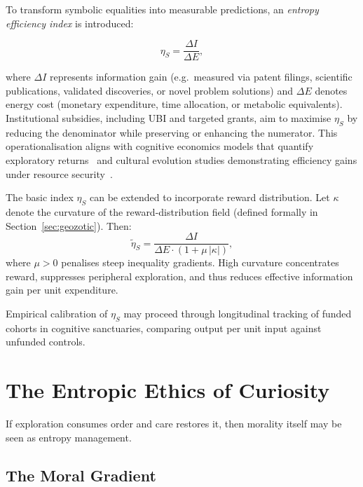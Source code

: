 \documentclass[12pt,a4paper]{article}
\theoremstyle{definition}
\begin{document}
To transform symbolic equalities into measurable predictions, an
\emph{entropy efficiency index} is introduced:

\begin{equation}
  \eta_S = \frac{\Delta I}{\Delta E},
  \label{eq:etaS}
\end{equation}

where $\Delta I$ represents information gain (e.g.\ measured via patent
filings, scientific publications, validated discoveries, or novel problem
solutions) and $\Delta E$ denotes energy cost (monetary expenditure, time
allocation, or metabolic equivalents).  Institutional subsidies, including UBI
and targeted grants, aim to maximise $\eta_S$ by reducing the denominator while
preserving or enhancing the numerator.  This operationalisation aligns with
cognitive economics models that quantify exploratory
returns~\citep{friston2023} and cultural evolution studies demonstrating
efficiency gains under resource security~\citep{henrich2016}.

\begin{tcolorbox}[formalbox, title={Extended Index: Inequality Penalty}]
  The basic index $\eta_S$ can be extended to incorporate reward distribution.
  Let $\kappa$ denote the curvature of the reward-distribution field (defined
  formally in Section~\ref{sec:geozotic}).  Then:
  \begin{equation}
    \tilde{\eta}_S = \frac{\Delta I}{\Delta E \cdot (1 + \mu\,|\kappa|)},
    \label{eq:etaS_extended}
  \end{equation}
  where $\mu > 0$ penalises steep inequality gradients.  High curvature
  concentrates reward, suppresses peripheral exploration, and thus reduces
  effective information gain per unit expenditure.
\end{tcolorbox}

Empirical calibration of $\eta_S$ may proceed through longitudinal tracking of
funded cohorts in cognitive sanctuaries, comparing output per unit input against
unfunded controls.

\section{The Entropic Ethics of Curiosity}

If exploration consumes order and care restores it, then morality itself may be
seen as entropy management.

\subsection{The Moral Gradient}
\end{document}

